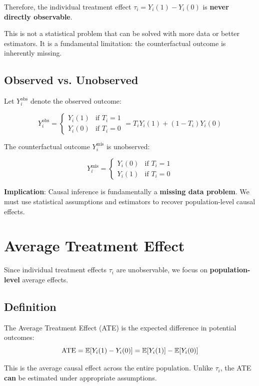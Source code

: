 Therefore, the individual treatment effect \(\tau_i = Y_i(1) - Y_i(0)\)
is \textbf{never directly observable}.

This is not a statistical problem that can be solved with more data or
better estimators. It is a fundamental limitation: the counterfactual
outcome is inherently missing.

\subsection{Observed vs. Unobserved}\label{_observed_vs_unobserved}

Let \(Y_i^{\text{obs}}\) denote the observed outcome:

\[Y_i^{\text{obs}} = \begin{cases}
Y_i(1) & \text{if } T_i = 1 \\
Y_i(0) & \text{if } T_i = 0
\end{cases} = T_i Y_i(1) + (1 - T_i) Y_i(0)\]

The counterfactual outcome \(Y_i^{\text{mis}}\) is unobserved:

\[Y_i^{\text{mis}} = \begin{cases}
Y_i(0) & \text{if } T_i = 1 \\
Y_i(1) & \text{if } T_i = 0
\end{cases}\]

\textbf{Implication}: Causal inference is fundamentally a
\textbf{missing data problem}. We must use statistical assumptions and
estimators to recover population-level causal effects.

\section{Average Treatment Effect}\label{_average_treatment_effect}

Since individual treatment effects \(\tau_i\) are unobservable, we focus
on \textbf{population-level} average effects.

\subsection{Definition}\label{_definition_2}

\begin{definition}
\label{def:ate}
%
The Average Treatment Effect (ATE) is the expected difference in potential outcomes:
\[
\text{ATE} = \mathbb{E}[Y_i(1) - Y_i(0)] = \mathbb{E}[Y_i(1)] - \mathbb{E}[Y_i(0)]
\]

This is the average causal effect across the entire population. Unlike $\tau_i$, the ATE \textbf{can} be estimated under appropriate assumptions.
\end{definition}

